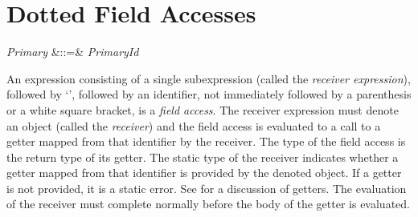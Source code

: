 %
%
%
%

\section{Dotted Field Accesses}

\begin{Grammar}
\emph{Primary} &::=& \emph{Primary}\emph{Id}\\
\end{Grammar}

An expression consisting of a single subexpression (called the
\emph{receiver expression}), followed by `', followed by an
identifier, not immediately followed by a parenthesis or a white
square bracket, is a
\emph{field access}.
The receiver expression must denote an object
(called the \emph{receiver}) and the field access is evaluated to a call
to a getter mapped from that identifier by the receiver.
The type of the field access is the return type of its getter.
The static type of
the receiver indicates whether a getter mapped from that identifier is
provided by the denoted object.  If a getter is not provided, it is a
static error.  See  for a discussion of getters.
The evaluation of the receiver must complete normally before the body of
the getter is evaluated.
